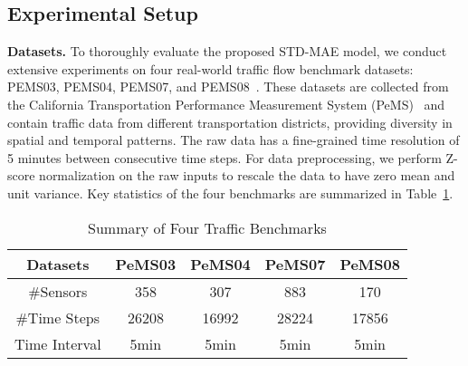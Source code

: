 \documentclass[letterpaper]{article} \usepackage{aaai24}  \usepackage{times}  \usepackage{helvet}  \usepackage{courier}  \usepackage[hyphens]{url}  \usepackage{graphicx} \urlstyle{rm} \def\UrlFont{\rm}  \usepackage{natbib}  \usepackage{caption} \frenchspacing  \setlength{\pdfpagewidth}{8.5in} \setlength{\pdfpageheight}{11in} \usepackage{algorithm}
\begin{document}
\subsection{Experimental Setup}
\noindent\textbf{Datasets.} To thoroughly evaluate the proposed STD-MAE model, we conduct extensive experiments on four real-world traffic flow benchmark datasets: PEMS03, PEMS04, PEMS07, and PEMS08~\cite{song2020spatial}. These datasets are collected from the California Transportation Performance Measurement System (PeMS)~\cite{chen2001freeway} and contain traffic data from different transportation districts, providing diversity in spatial and temporal patterns. The raw data has a fine-grained time resolution of 5 minutes between consecutive time steps. For data preprocessing, we perform Z-score normalization on the raw inputs to rescale the data to have zero mean and unit variance. Key statistics of the four benchmarks are summarized in Table~\ref{tab:dataset}.
\begin{table}[h] \renewcommand\arraystretch{1.2}
    \footnotesize
    \begin{tabular}{ccccc}
    \hline
    Datasets & PeMS03 &  PeMS04&  PeMS07& PeMS08\\ \hline
\#Sensors    & 358  &  307   & 883  & 170  \\
\#Time Steps    & 26208  & 16992  & 28224  & 17856\\
    Time Interval    &  5min&  5min&  5min& 5min\\ 
\hline
    \end{tabular}\caption{Summary of Four Traffic Benchmarks}
  \label{tab:dataset}\end{table}
\end{document}

